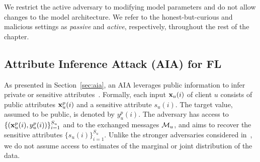 We restrict the active adversary to modifying model parameters and do not allow changes to the model architecture. We refer to the honest-but-curious and malicious settings as \emph{passive} and \emph{active}, respectively, throughout the rest of the chapter.


\subsection{Attribute Inference Attack (AIA) for FL}

As presented in Section~\ref{sec:aia}, an AIA leverages public information to infer private or sensitive attributes~\cite{kasiviswanathan2013power,aia_fredrikson, yeom2018privacyriskmachinelearning,lyu2021novelattributereconstructionattack,chen2024practical}.
Formally, each input ${\mathbf{x}}_u(i)$ of client $u$ consists of public attributes ${\mathbf{x}}_u^p(i)$ and a sensitive attribute $s_u(i)$. The target value, assumed to be public, is denoted by $y_u^p(i)$. The adversary has access to $\{({\mathbf{x}}_u^p(i),y_u^p(i))\}_{i=1}^{S_u}$ and to the exchanged messages $\mathcal{M}_u$, and aims to recover the sensitive attributes $\{s_u(i)\}_{i=1}^{S_u}$. Unlike the stronger adversaries considered in~\cite{aia_fredrikson,yeom2018privacyriskmachinelearning}, we do not assume access to estimates of the marginal or joint distribution of the data.


